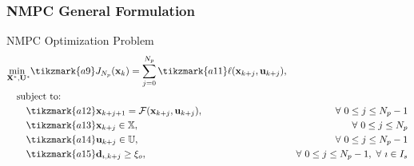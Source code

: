 	\begin{frame}
		\frametitle{NMPC General Formulation}
		\begin{block}{NMPC Optimization Problem}
			\begin{align*}
				&\underset{\mathbf{X}^*,\mathbf{U}^*}{\text{min    }}
				\tikzmark{a9}J_{N_p}(\mathbf{x}_k) = \sum_{j=0}^{N_p}\tikzmark{a11}\ell (\mathbf{x}_{k + j},\mathbf{u}_{k + j}), \\
				&\quad \text{subject to:} \notag  \\
				&\quad\quad \tikzmark{a12}\mathbf{x}_{k+j+1} = \mathcal{F}(\mathbf{x}_{k+j},\mathbf{u}_{k+j}), & \forall\text{ } 0\leq j\leq N_p-1  \\ 
				&\quad\quad \tikzmark{a13}\mathbf{x}_{k+j} \in \mathbb{X}, & \forall \text{ }0\leq j\leq N_p \\
				&\quad\quad \tikzmark{a14}\mathbf{u}_{k+j} \in \mathbb{U}, & \forall \text{ }0\leq j\leq N_p-1 \\
				&\quad\quad \tikzmark{a15}\mathbf{d}_{\imath,k+j}  \geq \xi_o, & \forall\text{ } 0\leq j\leq N_p-1, \text{ }\forall\text{ } \imath \in I_s
			\end{align*}
		\end{block}
	

\end{frame}
